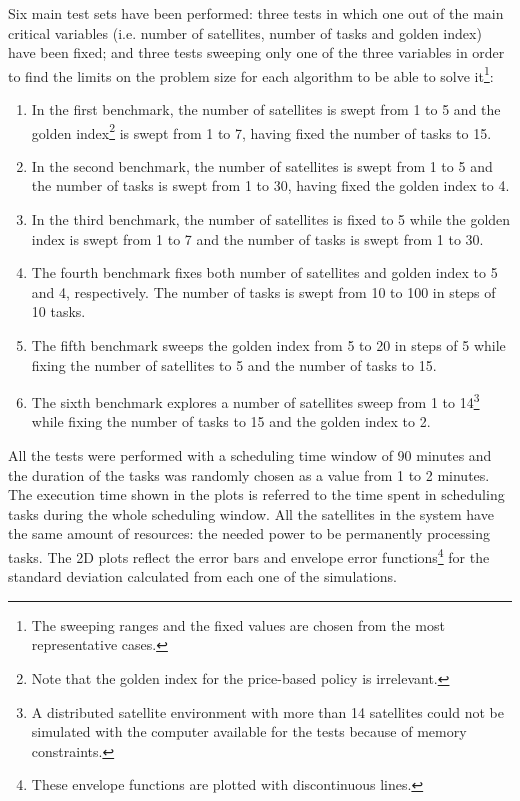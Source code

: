 Six main test sets have been performed: three tests in which one out of the main critical variables (i.e. number of satellites, number of tasks and golden index) have been fixed; and three tests sweeping only one of the three variables in order to find the limits on the problem size for each algorithm to be able to solve it\footnote{The sweeping ranges and the fixed values are chosen from the most representative cases.}:
\begin{enumerate}
\item In the first benchmark, the number of satellites is swept from 1 to 5 and the golden index\footnote{Note that the golden index for the price-based policy is irrelevant.} is swept from 1 to 7, having fixed the number of tasks to 15.

\item In the second benchmark, the number of satellites is swept from 1 to 5 and the number of tasks is swept from 1 to 30, having fixed the golden index to 4.

\item In the third benchmark, the number of satellites is fixed to 5 while the golden index is swept from 1 to 7 and the number of tasks is swept from 1 to 30.

\item The fourth benchmark fixes both number of satellites and golden index to 5 and 4, respectively. The number of tasks is swept from 10 to 100 in steps of 10 tasks.

\item The fifth benchmark sweeps the golden index from 5 to 20 in steps of 5 while fixing the number of satellites to 5 and the number of tasks to 15.

\item The sixth benchmark explores a number of satellites sweep from 1 to 14\footnote{A distributed satellite environment with more than 14 satellites could not be simulated with the computer available for the tests because of memory constraints.} while fixing the number of tasks to 15 and the golden index to 2.
\end{enumerate}

All the tests were performed with a scheduling time window of 90 minutes and the duration of the tasks was randomly chosen as a value from 1 to 2 minutes. The execution time shown in the plots is referred to the time spent in scheduling tasks during the whole scheduling window. All the satellites in the system have the same amount of resources: the needed power to be permanently processing tasks. The 2D plots reflect the error bars and envelope error functions\footnote{These envelope functions are plotted with discontinuous lines.} for the standard deviation calculated from each one of the simulations.

